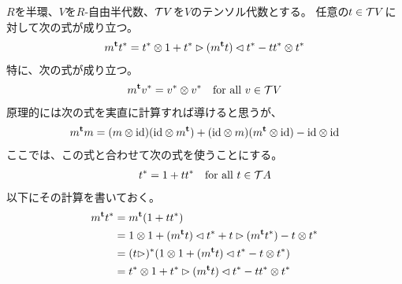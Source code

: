 	\begin{note}[クリーネスターの余積]\label{note:クリーネスターの余積} %
		$R$を半環、$V$を$R$-自由半代数、${{\mathcal{T}}} V$を$V$のテンソル代数とする。
		任意の$t\in {\ensuremath{{\mathcal{T}}}} V$に対して次の式が成り立つ。
		\begin{equation*}\begin{split}
			m^{\mathbf{t}} t^* 
			= t^*\otimes 1 + t^*\rhd(m^{\mathbf{t}} t)\lhd t^* - tt^*\otimes t^*
		\end{split}\end{equation*}
		特に、次の式が成り立つ。
		\begin{equation*}\begin{split}
			m^{\mathbf{t}} v^* = v^*\otimes v^* \quad\text{for all } v\in{\ensuremath{{\mathcal{T}}}} V
		\end{split}\end{equation*}
		原理的には次の式を実直に計算すれば導けると思うが、
		\begin{equation*}\begin{split}
			m^{\mathbf{t}} m =(m\otimes{\ensuremath{\operatorname{id}}})({\operatorname{id}}\otimes m^{\mathbf{t}}) 
			+ ({\operatorname{id}}\otimes m)(m^{\mathbf{t}}\otimes{\ensuremath{\operatorname{id}}}) - {\operatorname{id}}\otimes {\ensuremath{\operatorname{id}}}
		\end{split}\end{equation*}
		ここでは、この式と合わせて次の式を使うことにする。
		\begin{equation*}\begin{split}
			t^* = 1 + tt^* \quad\text{for all } t\in {\ensuremath{{\mathcal{T}}}} A
		\end{split}\end{equation*}
		以下にその計算を書いておく。
		\begin{equation*}\begin{split}
			m^{\mathbf{t}} t^* &= m^{\mathbf{t}}(1 + tt^*) \\
			&= 1\otimes 1 + (m^{\mathbf{t}} t)\lhd t^* + t\rhd (m^{\mathbf{t}} t^*)
			- t\otimes t^* \\
			&= (t\rhd)^*(1\otimes 1 + (m^{\mathbf{t}} t)\lhd t^* - t\otimes t^*) \\
			&= t^*\otimes 1 + t^*\rhd(m^{\mathbf{t}} t)\lhd t^* - tt^*\otimes t^* \\
		\end{split}\end{equation*}
	\end{note} %
